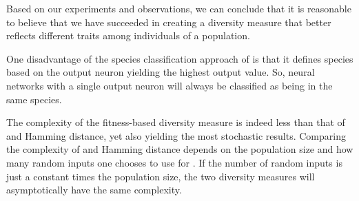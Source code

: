 Based on our experiments and observations, we can conclude that it is reasonable to believe that we have succeeded in creating a diversity measure that better reflects different traits among individuals of a population.

One disadvantage of the species classification approach of \dia{} is that it defines species based on the output neuron yielding the highest output value. So, neural networks with a single output neuron will always be classified as being in the same species.

The complexity of the fitness-based diversity measure is indeed less than that of \dia{} and Hamming distance, yet also yielding the most stochastic results. Comparing the complexity of \dia{} and Hamming distance depends on the population size and how many random inputs one chooses to use for \dia{}. If the number of random inputs is just a constant times the population size, the two diversity measures will asymptotically have the same complexity.
